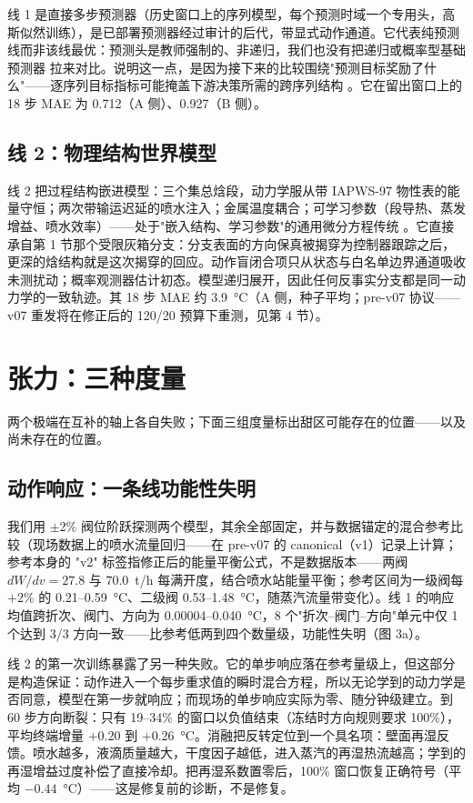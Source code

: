 \documentclass[11pt]{article}
\begin{document}
线 1 是直接多步预测器（历史窗口上的序列模型，每个预测时域一个专用头，高斯似然训练），是已部署预测器经过审计的后代，带显式动作通道。它代表纯预测线而非该线最优：预测头是教师强制的、非递归，我们也没有把递归或概率型基础预测器 \cite{ansari2024chronos, das2024timesfm} 拉来对比。说明这一点，是因为接下来的比较围绕"预测目标奖励了什么"——逐序列目标指标可能掩盖下游决策所需的跨序列结构 \cite{wan2026forecast}。它在留出窗口上的 18 步 MAE 为 0.712（A 侧）、0.927（B 侧）。

\subsection{线 2：物理结构世界模型}

线 2 把过程结构嵌进模型：三个集总焓段，动力学服从带 IAPWS-97 物性表的能量守恒；两次带输运迟延的喷水注入；金属温度耦合；可学习参数（段导热、蒸发增益、喷水效率）——处于"嵌入结构、学习参数"的通用微分方程传统 \cite{chen2018neuralode, rackauckas2020ude}。它直接承自第 1 节那个受限灰箱分支：分支表面的方向保真被揭穿为控制器跟踪之后，更深的焓结构就是这次揭穿的回应。动作盲闭合项只从状态与白名单边界通道吸收未测扰动；概率观测器估计初态。模型递归展开，因此任何反事实分支都是同一动力学的一致轨迹。其 18 步 MAE 约 3.9~\si{\degreeCelsius}（A 侧，种子平均；pre-v07 协议——v07 重发将在修正后的 120/20 预算下重测，见第 4 节）。

\section{张力：三种度量}

两个极端在互补的轴上各自失败；下面三组度量标出甜区可能存在的位置——以及尚未存在的位置。

\subsection{动作响应：一条线功能性失明}

我们用 $\pm$2\% 阀位阶跃探测两个模型，其余全部固定，并与数据锚定的混合参考比较（现场数据上的喷水流量回归——在 pre-v07 的 canonical（v1）记录上计算；参考本身的 "v2" 标签指修正后的能量平衡公式，不是数据版本——两阀 $dW/dv = 27.8$ 与 $70.0$~t/h 每满开度，结合喷水站能量平衡；参考区间为一级阀每 $+2\%$ 的 0.21--0.59~\si{\degreeCelsius}、二级阀 0.53--1.48~\si{\degreeCelsius}，随蒸汽流量带变化）。线 1 的响应均值跨折次、阀门、方向为 0.00004--0.040~\si{\degreeCelsius}，8 个"折次--阀门--方向"单元中仅 1 个达到 3/3 方向一致——比参考低两到四个数量级，功能性失明（图 3a）。

线 2 的第一次训练暴露了另一种失败。它的单步响应落在参考量级上，但这部分是构造保证：动作进入一个每步重求值的瞬时混合方程，所以无论学到的动力学是否同意，模型在第一步就响应；而现场的单步响应实际为零、随分钟级建立。到 60 步方向断裂：只有 19--34\% 的窗口以负值结束（冻结时方向规则要求 100\%），平均终端增量 $+0.20$ 到 $+0.26$~\si{\degreeCelsius}。消融把反转定位到一个具名项：壁面再湿反馈。喷水越多，液滴质量越大，干度因子越低，进入蒸汽的再湿热流越高；学到的再湿增益过度补偿了直接冷却。把再湿系数置零后，100\% 窗口恢复正确符号（平均 $-0.44$~\si{\degreeCelsius}）——这是修复前的诊断，不是修复。
\end{document}
